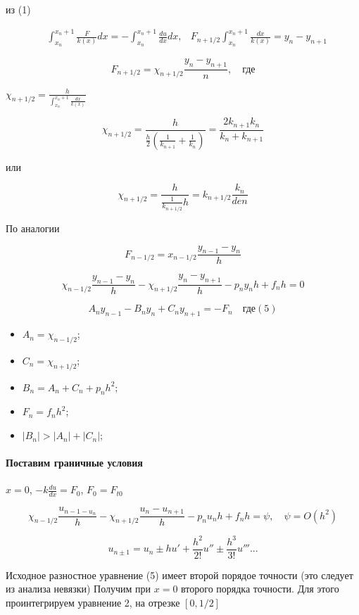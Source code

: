 из (1)

\begin{align*}
	&\int_{x_n}^{x_n + 1} \frac{F}{k(x)} dx = - \int_{x_n}^{x_n + 1} \frac{du}{dx} dx, &F_{n+1/2} \int_{x_n}^{x_n + 1} \frac{dx}{k(x)} = y_n - y_{n+1}
\end{align*}

\[
	F_{n+1/2} = \chi_{n+1/2} \frac{y_n - y_{n+1}}{n}, \quad \text{где}
\]

$\chi_{n+1/2} = \frac{h}{\int_{x_n}^{x_n + 1} \frac{dx}{k(x)}}$

\[
	\chi_{n+1/2} = \frac{h}{\frac{h}{2}(\frac{1}{k_{n+1}} + \frac{1}{k_n})} = \frac{2k_{n+1}k_n}{k_n + k_{n+1}}
\]

или

\[
	\chi_{n+1/2} = \frac{h}{\frac{1}{k_{n + 1/2}} h} = k_{n+1/2} \frac{k_n}{den}
\]

По аналогии

\[
	F_{n-1/2} = x_{n-1/2} \frac{y_{n-1} - y_n}{h}
\]

\[
	\chi_{n-1/2} \frac{y_{n-1} - y_n}{h} - \chi_{n + 1/2} \frac{y_{n} - y_{n+1}}{h} - p_n y_n h + f_n h = 0
\]

\[
	A_n y_{n-1} - B_n y_n + C_n y_{n+1} = - F_n \quad \text{где} (5)
\]

\begin{itemize}
	\item $A_n = \chi_{n-1/2}$;
	\item $C_n = \chi_{n + 1/2}$;
	\item $B_n  = A_n + C_n + p_n h^2$;
	\item	$F_n = f_n h^2$;
	\item	$|B_n| > |A_n| + |C_n|$;
\end{itemize}


\paragraph{Поставим граничные условия} $x = 0$, $-k \frac{du}{dx} = F_0$, $F_0 = F_{t0}$

\[
\chi_{n-1/2} \frac{u_{n-1 - u_n}}{h} - \chi_{n+1/2} \frac{u_n - u_{n+1}}{h} - p_n u_n h + f_n h = \psi, \quad \psi = O(h^2)
\]

\[
	u_{n \pm 1} = u_n \pm h u' + \frac{h^2}{2!} u'' \pm \frac{h^3}{3!}u''' ...
\]

Исходное разностное уравнение (5) имеет второй порядое точности (это следует из анализа невязки) Получим при $x=0$ второго порядка точности. Для этого проинтегрируем уравнение 2, на отрезке $[0, 1/2]$

